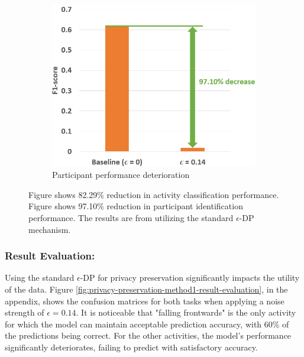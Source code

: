 \documentclass{l4proj}
\begin{document}
\begin{figure}[h]
\begin{subfigure}{0.35\textwidth}
    \includegraphics[width=\textwidth]{images/privacy-preservation-difference-comparison-method1-participant-f1-scores.png}
    \caption{Participant performance deterioration}
    \label{fig:privacy-preservation-difference-comparison-method1-participant-f1-scores}
    \end{subfigure}
    \caption{Figure  shows 82.29\% reduction in activity classification performance. Figure  shows 97.10\% reduction in participant identification performance. The results are from utilizing the standard $\epsilon$-DP mechanism.}
    \label{fig:privacy-preservation-epsilon-evaluation-method1-f1-scores}
\end{figure}

\subsubsection{Result Evaluation:}
Using the standard $\epsilon$-DP for privacy preservation significantly impacts the utility of the data. Figure \ref{fig:privacy-preservation-method1-result-evaluation}, in the appendix, shows the confusion matrices for both tasks when applying a noise strength of $\epsilon=0.14$. It is noticeable that "falling frontwards" is the only activity for which the model can maintain acceptable prediction accuracy, with 60\% of the predictions being correct. For the other activities, the model's performance significantly deteriorates, failing to predict with satisfactory accuracy.
\end{document}
